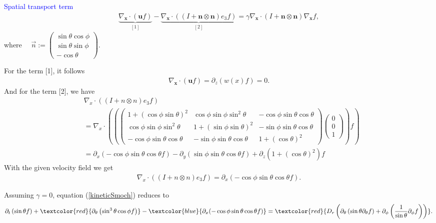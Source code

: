 \begin{frame}
	\scriptsize
	\textcolor{blue}{Spatial transport term}
	\begin{align*}
		\underbrace{\nabla_{\boldsymbol{x}} \cdot(\boldsymbol{u} f)}_{[1]} -\underbrace{\nabla_{\boldsymbol{x}} \cdot\left((I+\boldsymbol{n} \otimes \boldsymbol{n}) e_3 f\right)}_{[2]} = \gamma \nabla_{\boldsymbol{x}} \cdot(I+\boldsymbol{n} \otimes \boldsymbol{n}) \nabla_{\boldsymbol{x}} f,
		\end{align*}
        where $\quad \vec{n} :=\left(\begin{array}{c}\sin \theta \cos \phi \\ \sin \theta \sin \phi \\ -\cos \theta\end{array}\right)$.

\pause
\vspace{8mm}
For the term [1], it follows
	\begin{align*}
	\nabla_{\boldsymbol{x}}\cdot(\boldsymbol{u} f) = \partial_z (w(x)f) = 0.
	\end{align*}
\pause
And for the term [2], we have
\begin{align*}
	&\nabla_x \cdot ((I+n \otimes n)e_3f) \\
	&= \nabla_x \cdot \left(\left(\left(\begin{array}{ccc}
		1+(\cos \phi \sin \theta)^2 & \cos \phi \sin \phi \sin^2 \theta & -\cos\phi \sin\theta \cos\theta \\
		\cos \phi \sin\phi \sin^2\theta & 1+(\sin\phi \sin\theta)^2 & -\sin\phi \sin\theta \cos\theta \\
		-\cos\phi \sin\theta \cos\theta & -\sin\phi \sin\theta \cos\theta & 1+(\cos \theta)^2
	\end{array}\right) \left(\begin{array}{c} 0\\ 0\\1 \end{array}\right) \right)f \right) \\
	&= \partial_x (-\cos\phi \sin\theta \cos\theta f) - \partial_y (\sin\phi \sin\theta \cos\theta f) + \partial_z(1+(\cos \theta)^2) f
\end{align*}
With the given velocity field we get
\begin{align}
	\nabla_x \cdot ((I+n \otimes n)e_3f) = \partial_x (-\cos\phi \sin\theta \cos\theta f). \label{spatialterm_wx}
\end{align}
\end{frame}
\begin{frame}
\scriptsize
	Assuming $\gamma = 0$, equation (\ref{kineticSmoch}) reduces to
	\begin{align}
		\partial_{t}\left(\sin \theta f\right)+ \textcolor{red}{\partial_\theta\left( \sin ^3 \theta \cos \phi f\right)} - \textcolor{blue}{\partial_x(-\cos\phi \sin\theta \cos\theta f)}
		= \textcolor{red}{D_{r}\left(\partial_\theta \left(\sin \theta \partial_\theta f\right)+ \partial_\phi\left(\frac{1}{\sin \theta} \partial_\phi f\right)\right)}.
	\end{align}
\end{frame}
